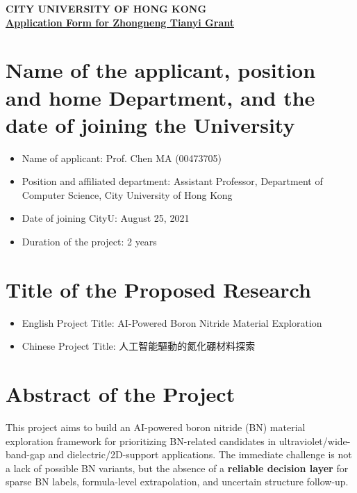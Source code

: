 \documentclass[12pt,a4paper]{article}
\begin{document}
\vspace{-60pt}
\begin{center}
    \textbf{CITY UNIVERSITY OF HONG KONG} \\
    \vspace{10pt}
    \underline{\textbf{Application Form for Zhongneng Tianyi Grant}} \\
\end{center}

\section{Name of the applicant, position and home Department, and the date of joining the University}

\begin{itemize}[leftmargin=15pt]
    \vspace{-8pt}
    \item Name of applicant: Prof. Chen MA (00473705)
    
    \vspace{-8pt}
    \item Position and affiliated department: Assistant Professor, Department of Computer Science, City University of Hong Kong
    
    \vspace{-8pt}
    \item Date of joining CityU: August 25, 2021
    
    \vspace{-8pt}
    \item Duration of the project: 2 years
\end{itemize}

\vspace{-20pt}
\section{Title of the Proposed Research}

\begin{itemize}
    \vspace{-8pt}
    \item English Project Title: AI-Powered Boron Nitride Material Exploration
    \vspace{-8pt}
    \item Chinese Project Title: 人工智能驅動的氮化硼材料探索
\end{itemize}

\vspace{-20pt}
\section{Abstract of the Project}
\vspace{-10pt}
This project aims to build an AI-powered boron nitride (BN) material exploration framework for prioritizing BN-related candidates in ultraviolet/wide-band-gap and dielectric/2D-support applications. The immediate challenge is not a lack of possible BN variants, but the absence of a \textbf{reliable decision layer} for sparse BN labels, formula-level extrapolation, and uncertain structure follow-up.
\end{document}
